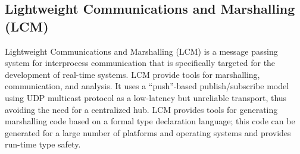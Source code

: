 \subsection{Lightweight Communications and Marshalling (LCM)}

Lightweight Communications and Marshalling (LCM) is a message passing system for interprocess communication that is specifically targeted for the development of real-time systems. LCM provide tools for marshalling, communication, and analysis. It uses a “push”-based publish/subscribe model using UDP multicast protocol as a low-latency but unreliable transport, thus avoiding the need for a centralized hub. LCM provides tools for generating marshalling code based on a formal type declaration language; this code can be generated for a large number of platforms and operating systems and provides run-time type safety.
